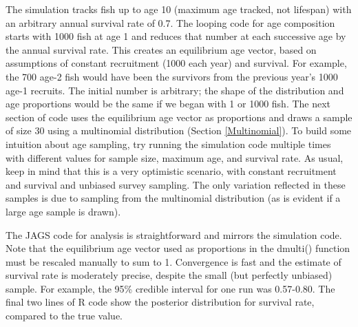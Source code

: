 \documentclass[
]{krantz}
\begin{document}
The simulation tracks fish up to age 10 (maximum age tracked, not lifespan) with an arbitrary annual survival rate of 0.7. The looping code for age composition starts with 1000 fish at age 1 and reduces that number at each successive age by the annual survival rate. This creates an equilibrium age vector, based on assumptions of constant recruitment (1000 each year) and survival. For example, the 700 age-2 fish would have been the survivors from the previous year's 1000 age-1 recruits. The initial number is arbitrary; the shape of the distribution and age proportions would be the same if we began with 1 or 1000 fish. The next section of code uses the equilibrium age vector as proportions and draws a sample of size 30 using a multinomial distribution (Section \ref{Multinomial}). To build some intuition about age sampling, try running the simulation code multiple times with different values for sample size, maximum age, and survival rate. As usual, keep in mind that this is a very optimistic scenario, with constant recruitment and survival and unbiased survey sampling. The only variation reflected in these samples is due to sampling from the multinomial distribution (as is evident if a large age sample is drawn).

The JAGS code for analysis is straightforward and mirrors the simulation code. Note that the equilibrium age vector used as proportions in the dmulti() function must be rescaled manually to sum to 1. Convergence is fast and the estimate of survival rate is moderately precise, despite the small (but perfectly unbiased) sample. For example, the 95\% credible interval for one run was 0.57-0.80. The final two lines of R code show the posterior distribution for survival rate, compared to the true value.
\end{document}
